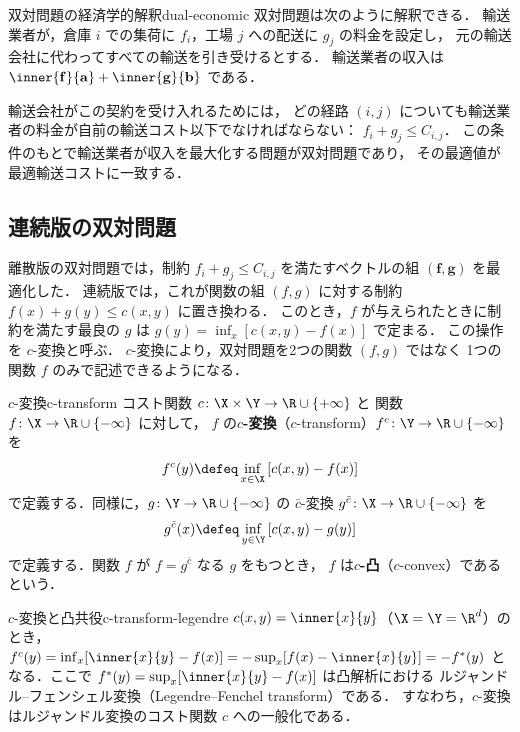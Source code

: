 \begin{remark}{双対問題の経済学的解釈}{dual-economic}
  双対問題は次のように解釈できる．
  輸送業者が，倉庫 $i$ での集荷に $f_i$，工場 $j$ への配送に $g_j$ の料金を設定し，
  元の輸送会社に代わってすべての輸送を引き受けるとする．
  輸送業者の収入は $\inner{\mathbf{f}}{\mathbf{a}} + \inner{\mathbf{g}}{\mathbf{b}}$ である．

  輸送会社がこの契約を受け入れるためには，
  どの経路 $(i, j)$ についても輸送業者の料金が自前の輸送コスト以下でなければならない：
  $f_i + g_j \leq C_{i,j}$．
  この条件のもとで輸送業者が収入を最大化する問題が双対問題であり，
  その最適値が最適輸送コストに一致する．
\end{remark}

\subsection{連続版の双対問題}
\label{subsec:continuous-dual}

離散版の双対問題では，制約 $f_i + g_j \leq C_{i,j}$ を満たすベクトルの組
$(\mathbf{f}, \mathbf{g})$ を最適化した．
連続版では，これが関数の組 $(f, g)$ に対する制約 $f(x) + g(y) \leq c(x, y)$ に置き換わる．
このとき，$f$ が与えられたときに制約を満たす最良の $g$ は
$g(y) = \inf_x [c(x, y) - f(x)]$ で定まる．
この操作を $c$-変換と呼ぶ．
$c$-変換により，双対問題を2つの関数 $(f, g)$ ではなく
1つの関数 $f$ のみで記述できるようになる．

\begin{definition}{$c$-変換}{c-transform}
  コスト関数 $c \colon \X \times \Y \to \R \cup \{+\infty\}$ と
  関数 $f \colon \X \to \R \cup \{-\infty\}$ に対して，
  $f$ の\textbf{$c$-変換}（$c$-transform）$f^c \colon \Y \to \R \cup \{-\infty\}$ を
  \[
    f^c(y) \defeq \inf_{x \in \X} \left[ c(x, y) - f(x) \right]
  \]
  で定義する．同様に，$g \colon \Y \to \R \cup \{-\infty\}$ の
  $\bar{c}$-変換 $g^{\bar{c}} \colon \X \to \R \cup \{-\infty\}$ を
  \[
    g^{\bar{c}}(x) \defeq \inf_{y \in \Y} \left[ c(x, y) - g(y) \right]
  \]
  で定義する．関数 $f$ が $f = g^{\bar{c}}$ なる $g$ をもつとき，
  $f$ は\textbf{$c$-凸}（$c$-convex）であるという．
\end{definition}

\begin{remark}{$c$-変換と凸共役}{c-transform-legendre}
  $c(x, y) = \inner{x}{y}$（$\X = \Y = \R^d$）のとき，
  $f^c(y) = \inf_x [\inner{x}{y} - f(x)]= -\sup_x [f(x) - \inner{x}{y}] = -f^*(y)$
  となる．ここで $f^*(y) = \sup_x [\inner{x}{y} - f(x)]$ は凸解析における
  ルジャンドル--フェンシェル変換（Legendre--Fenchel transform）である．
  すなわち，$c$-変換はルジャンドル変換のコスト関数 $c$ への一般化である．
\end{remark}

